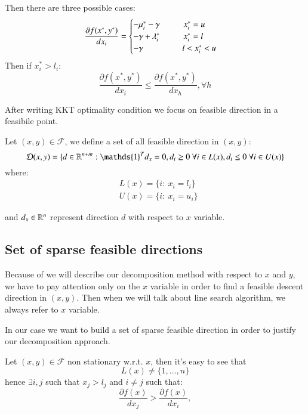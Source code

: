 Then there are three possible cases:
\begin{equation}
 \frac{\partial f(x^*,y^*)}{dx_i} = \begin{cases} -\mu_i^* -\gamma \hspace{1cm} x^*_i =u \\
 -\gamma+\lambda^*_i \hspace{1cm} x^*_i =l \\
 -\gamma \hspace{1.65cm} l<x^*_i <u 
\end{cases}
\end{equation}
Then if $x^*_i>l_i$: 
\begin{equation}
 \frac{\partial f(x^*,y^*)}{dx_i} \le \frac{\partial f(x^*,y^*)}{dx_h}, \forall h
\end{equation}

After writing KKT optimality condition we focus on feasible direction in a feasibile point.

Let $(x,y) \in \mathcal{F}$, we define a set of all feasible direction in $(x,y)$:
\begin{equation}
 \mathcal{D}(x,y)=\{ d \in \R^{n+m}: \mathds{1}^Td_x=0, d_i\ge 0 \ \forall i \in L(x), d_i\le 0 \ \forall i \in U(x)\}
\end{equation}
where:
\begin{equation}
 \begin{aligned}
  &L(x)=\{ i: \ x_i=l_i\}\\
  &U(x)=\{ i: \ x_i=u_i\}
 \end{aligned}
\end{equation}

and $d_x \in \mathbb{R}^n$ represent direction $d$ with respect to $x$ variable.

\subsection{Set of sparse feasible directions}
Because of we will describe our decomposition method with respect to $x$ and $y$, we have to pay attention only on the $x$ variable in order to find a feasible descent direction in $(x,y)$.
Then when we will talk about line search algorithm, we always refer to $x$ variable.

In our case we want to build a set of sparse feasible direction in order to justify our decomposition approach.

Let $(x,y) \in \mathcal{F}$ non stationary w.r.t. $x$, then it's easy to see that
\begin{equation}
 L(x)\ne \{1,\ldots,n\}
\end{equation}
hence $\exists i,j$ such that $x_j>l_j$ and $i \ne j$ such that:
\begin{equation}
 \frac{\partial f(x)}{dx_j} > \frac{\partial f(x)}{dx_i}, 
\end{equation}


